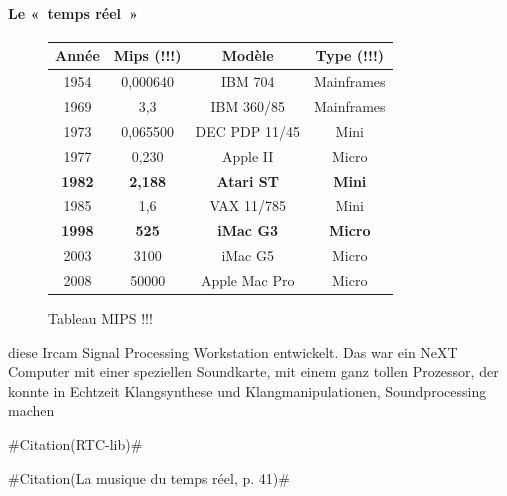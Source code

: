 \documentclass[a4paper,12pt]{article}
\newcommand{\guill}[1]{«~#1~»}
\newcommand{\zitat}[2]{\#Citation(#2)\#}
\begin{document}
\paragraph{Le \guill{temps réel} \\}

\begin{figure}
\begin{center}
\begin{tabular}{|c|c|c|c|}
\hline
\textbf{Année} & \textbf{Mips} (!!!) & \textbf{Modèle} & \textbf{Type} (!!!) \\
\hline
1954 & 0,000640 & IBM 704 & Mainframes \\
\hline
1969 & 3,3 & IBM 360/85 & Mainframes \\
\hline
1973 & 0,065500 & DEC PDP 11/45 & Mini \\
\hline
1977 & 0,230 & Apple II & Micro \\
\hline
\textbf{1982} & \textbf{2,188} & \textbf{Atari ST} & \textbf{Mini} \\
\hline
1985 & 1,6 & VAX 11/785 & Mini \\
\hline
\textbf{1998} & \textbf{525} & \textbf{iMac G3} & \textbf{Micro} \\
\hline
2003 & 3100 & iMac G5 & Micro \\
\hline
2008 & 50000 & Apple Mac Pro & Micro \\
\hline
\end{tabular}
\end{center}
\caption{\footnotesize Tableau MIPS !!!}
\label{tableaumips}
\end{figure}

diese Ircam Signal Processing Workstation entwickelt. Das war ein NeXT Computer mit einer speziellen Soundkarte, mit einem ganz tollen Prozessor, der konnte in Echtzeit Klangsynthese und Klangmanipulationen, Soundprocessing machen

\zitat{I immediately felt in love with it for it offered the possibility of realtime processing and interactivity. (In LOGO, it took many hours to calculate a score list which I had to transcribe into of musical notation in order to analyze it - a very time-consuming procedure).}
{RTC-lib}

\zitat{Mais le temps réel est une notion technologique avant d'être une notion musicale. C'est en fait une illusion. Le temps réel n'existe jamais dans la réalité technologique parce qu'une machine met toujours un certain temps, même si celui-ci est extrêmement bref, pour effectuer ses calculs.}
{La musique du temps réel, p. 41}
\end{document}
